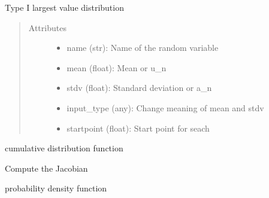 \documentclass[letterpaper,10pt,english]{sphinxmanual}
\begin{document}
\begin{fulllineitems}
Type I largest value distribution
\begin{quote}\begin{description}
\item[{Attributes }] \leavevmode\begin{itemize}
\item {} 
name (str):   Name of the random variable

\item {} 
mean (float): Mean or u\_n

\item {} 
stdv (float): Standard deviation or a\_n

\item {} 
input\_type (any): Change meaning of mean and stdv

\item {} 
startpoint (float): Start point for seach

\end{itemize}

\end{description}\end{quote}


\begin{fulllineitems}
cumulative distribution function

\end{fulllineitems}



\begin{fulllineitems}
Compute the Jacobian

\end{fulllineitems}



\begin{fulllineitems}
probability density function

\end{fulllineitems}




\end{fulllineitems}
\end{document}
